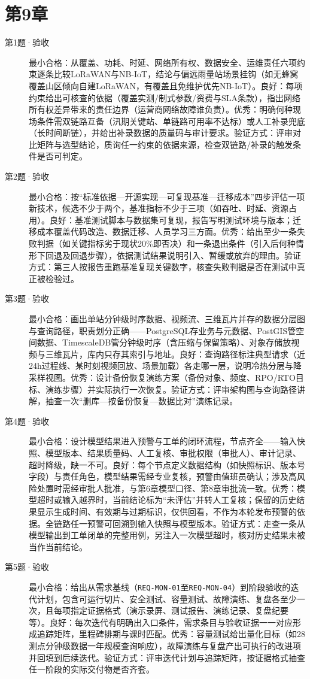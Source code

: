 \section{第9章}
\begin{description}
  \item[第1题·验收] 最小合格：从覆盖、功耗、时延、网络所有权、数据安全、运维责任六项约束逐条比较LoRaWAN与NB-IoT，结论与偏远雨量站场景挂钩（如无蜂窝覆盖山区倾向自建LoRaWAN，有覆盖且免维护优先NB-IoT）。良好：每项约束给出可核查的依据（覆盖实测/制式参数/资费与SLA条款），指出网络所有权差异带来的责任边界（运营商网络故障谁负责）。优秀：明确何种现场条件需双链路互备（汛期关键站、单链路可用率不达标）或人工补录兜底（长时间断链），并给出补录数据的质量码与审计要求。验证方式：评审对比矩阵与选型结论，质询任一约束的依据来源，检查双链路/补录的触发条件是否可判定。
  \item[第2题·验收] 最小合格：按“标准依据—开源实现—可复现基准—迁移成本”四步评估一项新技术，候选不少于两个，基准指标不少于三项（如吞吐、时延、资源占用）。良好：基准测试脚本与数据集可复现，报告写明测试环境与版本；迁移成本覆盖代码改造、数据迁移、人员学习三方面。优秀：给出至少一条失败判据（如关键指标劣于现状20\%即否决）和一条退出条件（引入后何种情形下回退及回退步骤），依据测试结果说明引入、暂缓或放弃的理由。验证方式：第三人按报告重跑基准复现关键数字，核查失败判据是否在测试中真正被检验过。
  \item[第3题·验收] 最小合格：画出单站分钟级时序数据、视频流、三维瓦片并存的数据分层图与查询路径，职责划分正确——PostgreSQL存业务与元数据、PostGIS管空间数据、TimescaleDB管分钟级时序（含压缩与保留策略）、对象存储放视频与三维瓦片，库内只存其索引与地址。良好：查询路径标注典型请求（近24h过程线、某时刻视频回放、场景加载）各走哪一层，说明冷热分层与降采样视图。优秀：设计备份恢复演练方案（备份对象、频度、RPO/RTO目标、演练步骤）并实际执行一次恢复。验证方式：评审架构图与查询路径讲解，抽查一次“删库—按备份恢复—数据比对”演练记录。
  \item[第4题·验收] 最小合格：设计模型结果进入预警与工单的闭环流程，节点齐全——输入快照、模型版本、结果质量码、人工复核、审批权限（审批人）、审计记录、超时降级，缺一不可。良好：每个节点定义数据结构（如快照标识、版本号字段）与责任角色，模型结果需经专业复核，预警由值班员确认；涉及高风险处置时需经审批人批准，与第6章模型口径、第8章审批流一致。优秀：模型超时或输入越界时，当前结论标为“未评估”并转人工复核；保留的历史结果显示生成时间、有效期与过期标识，仅供回看，不作为本轮发布预警的依据。全链路任一预警可回溯到输入快照与模型版本。验证方式：走查一条从模型输出到工单闭单的完整用例，另注入一次模型超时，核对历史结果未被当作当前结论。
  \item[第5题·验收] 最小合格：给出从需求基线（\texttt{REQ-MON-01}至\texttt{REQ-MON-04}）到阶段验收的迭代计划，包含可运行切片、安全测试、容量测试、故障演练、复盘各至少一次，且每项指定证据格式（演示录屏、测试报告、演练记录、复盘纪要等）。良好：每次迭代有明确出入口条件，需求条目与验收证据一一对应形成追踪矩阵，里程碑排期与课时匹配。优秀：容量测试给出量化目标（如28测点分钟级数据一年规模查询响应），故障演练与复盘产出可执行的改进项并回填到后续迭代。验证方式：评审迭代计划与追踪矩阵，按证据格式抽查任一阶段的实际交付物是否齐套。

\end{description}
